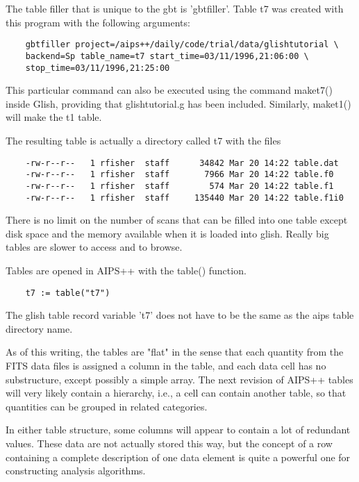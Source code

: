     The table filler that is unique to the gbt is 'gbtfiller'.  Table t7
was created with this program with the following arguments:

\begin{verbatim}
	gbtfiller project=/aips++/daily/code/trial/data/glishtutorial \
	backend=Sp table_name=t7 start_time=03/11/1996,21:06:00 \
	stop_time=03/11/1996,21:25:00
\end{verbatim}

This particular command can also be executed using the command maket7()
inside Glish, providing that glishtutorial.g has been
included. Similarly, maket1() will make the t1 table.

The resulting table is actually a directory called t7 with the files

\begin{verbatim}
	-rw-r--r--   1 rfisher  staff      34842 Mar 20 14:22 table.dat
	-rw-r--r--   1 rfisher  staff       7966 Mar 20 14:22 table.f0
	-rw-r--r--   1 rfisher  staff        574 Mar 20 14:22 table.f1
	-rw-r--r--   1 rfisher  staff     135440 Mar 20 14:22 table.f1i0
\end{verbatim}

There is no limit on the number of scans that can be filled into one table
except disk space and the memory available when it is loaded into glish.
Really big tables are slower to access and to browse.

    Tables are opened in AIPS++ with the table() function.

\begin{verbatim}
	t7 := table("t7")
\end{verbatim}

The glish table record variable 't7' does not have to be the same as the
aips table directory name.

    As of this writing, the tables are "flat" in the sense that each
quantity from the FITS data files is assigned a column in the table, and
each data cell has no substructure, except possibly a simple array.  The
next revision of AIPS++ tables will very likely contain a hierarchy, i.e.,
a cell can contain another table, so that quantities can be grouped in
related categories.

    In either table structure, some columns will appear to contain a lot of
redundant values.  These data are not actually stored this way, but the
concept of a row containing a complete description of one data element is
quite a powerful one for constructing analysis algorithms.

